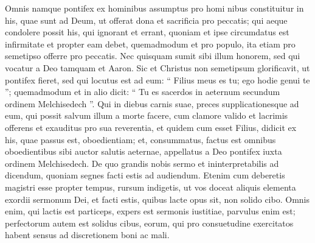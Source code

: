 \begin{biblechapter}
\begin{biblechapter}
\begin{biblechapter}
\begin{biblechapter}
\begin{biblechapter}
\verse Omnis namque pontifex ex hominibus assumptus pro homi nibus constituitur in his, quae sunt ad Deum, ut offerat dona et sacrificia pro peccatis; 
\verse qui aeque condolere possit his, qui ignorant et errant, quoniam et ipse circumdatus est infirmitate 
\verse et propter eam debet, quemadmodum et pro populo, ita etiam pro semetipso offerre pro peccatis. 
\verse Nec quisquam sumit sibi illum honorem, sed qui vocatur a Deo tamquam et Aaron. 
\verse Sic et Christus non semetipsum glorificavit, ut pontifex fieret, sed qui locutus est ad eum:
 “ Filius meus es tu;
 ego hodie genui te ”;
 \verse quemadmodum et in alio dicit:
 “ Tu es sacerdos in aeternum secundum ordinem Melchisedech ”.
 \verse Qui in diebus carnis suae, preces supplicationesque ad eum, qui possit salvum illum a morte facere, cum clamore valido et lacrimis offerens et exauditus pro sua reverentia, 
\verse et quidem cum esset Filius, didicit ex his, quae passus est, oboedientiam; 
\verse et, consummatus, factus est omnibus oboedientibus sibi auctor salutis aeternae, 
\verse appellatus a Deo pontifex iuxta ordinem Melchisedech.
 \verse De quo grandis nobis sermo et ininterpretabilis ad dicendum, quoniam segnes facti estis ad audiendum. 
\verse Etenim cum deberetis magistri esse propter tempus, rursum indigetis, ut vos doceat aliquis elementa exordii sermonum Dei, et facti estis, quibus lacte opus sit, non solido cibo. 
\verse Omnis enim, qui lactis est particeps, expers est sermonis iustitiae, parvulus enim est; 
\verse perfectorum autem est solidus cibus, eorum, qui pro consuetudine exercitatos habent sensus ad discretionem boni ac mali.
 

\end{biblechapter}
\end{biblechapter}
\end{biblechapter}
\end{biblechapter}
\end{biblechapter}
